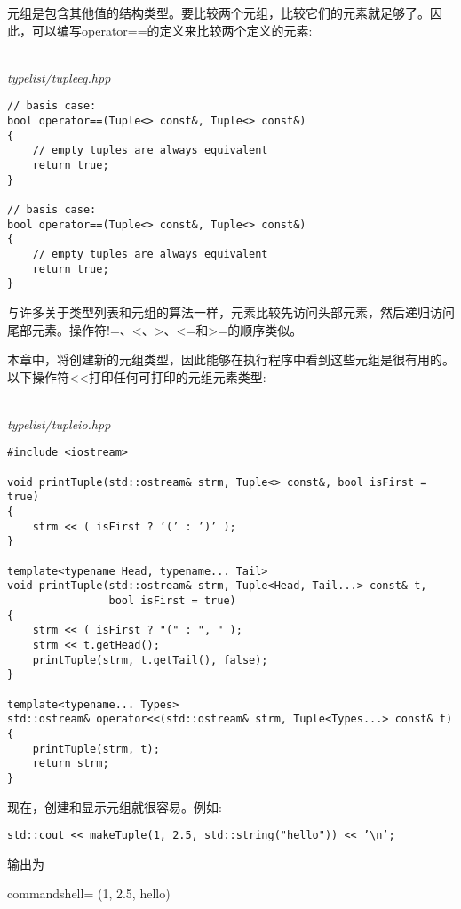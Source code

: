 



元组是包含其他值的结构类型。要比较两个元组，比较它们的元素就足够了。因此，可以编写operator==的定义来比较两个定义的元素:

\hspace*{\fill} \\ %
\noindent
\textit{typelist/tupleeq.hpp}
\begin{lstlisting}[style=styleCXX]
// basis case:
bool operator==(Tuple<> const&, Tuple<> const&)
{
	// empty tuples are always equivalent
	return true;
}

// basis case:
bool operator==(Tuple<> const&, Tuple<> const&)
{
	// empty tuples are always equivalent
	return true;
}
\end{lstlisting}

与许多关于类型列表和元组的算法一样，元素比较先访问头部元素，然后递归访问尾部元素。操作符!=、<、>、<=和>=的顺序类似。


本章中，将创建新的元组类型，因此能够在执行程序中看到这些元组是很有用的。以下操作符<<打印任何可打印的元组元素类型:

\hspace*{\fill} \\ %
\noindent
\textit{typelist/tupleio.hpp}
\begin{lstlisting}[style=styleCXX]
#include <iostream>

void printTuple(std::ostream& strm, Tuple<> const&, bool isFirst = true)
{
	strm << ( isFirst ? ’(’ : ’)’ );
}

template<typename Head, typename... Tail>
void printTuple(std::ostream& strm, Tuple<Head, Tail...> const& t,
				bool isFirst = true)
{
	strm << ( isFirst ? "(" : ", " );
	strm << t.getHead();
	printTuple(strm, t.getTail(), false);
}

template<typename... Types>
std::ostream& operator<<(std::ostream& strm, Tuple<Types...> const& t)
{
	printTuple(strm, t);
	return strm;
}
\end{lstlisting}

现在，创建和显示元组就很容易。例如:

\begin{lstlisting}[style=styleCXX]
std::cout << makeTuple(1, 2.5, std::string("hello")) << ’\n’;
\end{lstlisting}

输出为

\begin{tcblisting}{commandshell={}}
(1, 2.5, hello)
\end{tcblisting}





















